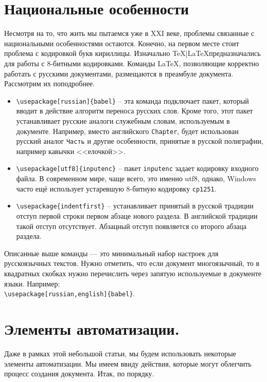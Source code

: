 \section{Национальные особенности}
Несмотря на то, что жить мы пытаемся уже в XXI веке, проблемы связанные с национальными
особенностями остаются. Конечно, на первом месте стоит проблема с кодировкой букв
кириллицы. Изначально \TeX|\LaTeX предназначались для работы с 8-битными кодировками. 
Команды \LaTeX, позволяющие корректно работать с русскими документами, размещаются в 
преамбуле документа. Рассмотрим их поподробнее.

\begin{itemize}
\item
\verb|\usepackage[russian]{babel}| -- эта команда подключает пакет, который	вводит в
действие алгоритм переноса русских слов. Кроме того, этот пакет устанавливает русские 
аналоги служебным словам, используемым в документе. Например, вместо английского 
\verb|Chapter|, будет использован русский аналог \verb|Часть| и другие особенности, 
принятые в русской полиграфии, например кавычки <<елочкой>>.
\item
\verb|\usepackage[utf8]{inputenc}| -- пакет \verb|inputenc| задает кодировку входного 
файла. В современном мире, чаще всего, это именно utf8, однако, Windows часто ещё 
использует устаревшую 8-битную кодировку \verb|cp1251|.
\item
\verb|\usepackage{indentfirst}| -- устанавливает принятый в русской традиции отступ
первой строки первом абзаце нового раздела. В английской традиции такой отступ 
отсутствует. Абзацный отступ появляется со второго абзаца раздела.
\end{itemize}

Описанные выше команды --- это минимальный набор настроек для русскоязычных текстов. Нужно 
отметить, что если документ многоязычный, то в квадратных скобках  нужно перечислить 
через запятую используемые в документе языки. Например:
\\ \verb|\usepackage[russian,english]{babel}|.
\section{Элементы автоматизации.}
Даже в рамках этой небольшой статьи, мы будем использовать некоторые элементы автоматизации.
Мы имеем ввиду действия, которые могут облегчить процесс создания документа. Итак, по порядку.
